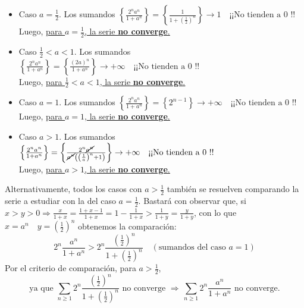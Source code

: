\documentclass[12pt]{article}
\begin{document}
\begin{ejercicio}[2 puntos]
\begin{enumerate}
\begin{itemize}[]
				\item[\textasteriskcentered] Caso $a=\frac{1}{2}$. Los sumandos $\left\{\frac{2^na^n}{1+a^n} \right\} = \left\{ \frac{1}{1 + \left(\frac{1}{2}\right)^n}\right\} \rightarrow 1 \quad \text{¡¡No tienden a 0 !!}$ \\
				Luego, \underline{\underline{para $a=\frac{1}{2}$, la serie \textbf{no converge}.}}
				
				\item[\textasteriskcentered] Caso $\frac{1}{2} < a < 1$. Los sumandos $\left\{\frac{2^na^n}{1+a^n} \right\} = \left\{ \frac{(2a)^n}{1+a^n}\right\} \rightarrow +\infty \quad \text{¡¡No tienden a 0 !!}$ \\
				Luego, \underline{\underline{para $\frac{1}{2} < a < 1$, la serie \textbf{no converge}.}}
				
				\item[\textasteriskcentered] Caso $a = 1$. Los sumandos $\left\{\frac{2^na^n}{1+a^n} \right\} = \left\{2^{n-1}\right\} \rightarrow +\infty \quad \text{¡¡No tienden a 0 !!}$ \\
				Luego, \underline{\underline{para $a=1$, la serie \textbf{no converge}.}}
				
				\item[\textasteriskcentered] Caso $a > 1$. Los sumandos $\left\{\frac{2^na^n}{1+a^n} \right\} = \left\{ \frac{2^n\cancel{a^n}}{\cancel{a^n}\left(\left(\frac{1}{a}\right)^n + 1\right)}\right\} \rightarrow +\infty \quad \text{¡¡No tienden a 0 !!}$ \\
				Luego, \underline{\underline{para $a > 1$, la serie \textbf{no converge}.}}
			\end{itemize}
		Alternativamente, todos los casos con $\boxed{a > \frac{1}{2}}$ también se resuelven comparando la serie a estudiar con la del caso $a=\frac{1}{2}$. Bastará con observar que, si $x>y>0 \Rightarrow \frac{x}{1+x} = \frac{1+x-1}{1+x} = 1- \frac{1}{1+x} > \frac{1}{1+y} = \frac{y}{1+y}$, con lo que $x=a^n \quad y=\left(\frac{1}{2}\right)^n$ obtenemos la comparación:
		$$
		2^n\frac{a^n}{1+a^n} > 2^n\frac{\left(\frac{1}{2}\right)^n}{1+\left(\frac{1}{2}\right)^n} \quad (\text{sumandos del caso } a=1)
		$$
		Por el criterio de comparación, para $a>\frac{1}{2}$,\\
		$$
		\text{ya que } \sum\limits_{n \geq 1} 2^n\frac{\left(\frac{1}{2}\right)^n}{1+\left(\frac{1}{2}\right)^n}  \text{ no converge } \Rightarrow \, \sum\limits_{n \geq 1}2^n\frac{a^n}{1+a^n}\text{ no converge.} 
		$$			
		\end{enumerate}
	\end{ejercicio}
	
\end{document}

